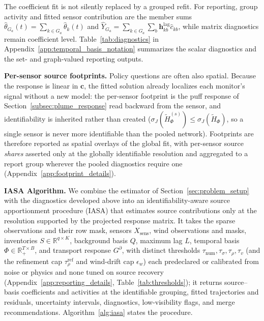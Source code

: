 The coefficient fit is not silently replaced by a grouped refit.  For reporting,
group activity and fitted sensor contribution are the member sums
\(\widehat\theta_{G_a}(t)=\sum_{k\in G_a}\widehat\theta_k(t)\) and
\(\widehat Y_{G_a}=\sum_{k\in G_a}\sum_b
\mathbf h_{kb}^{\mathrm{lag}}\widehat c_{kb}\), while matrix diagnostics remain
coefficient level.  Table~\ref{tab:diagnostics} in
Appendix~\ref{app:temporal_basis_notation} summarizes the scalar diagnostics and
the set- and graph-valued reporting outputs.

\noindent\textbf{Per-sensor source footprints.}
Policy questions are often also spatial.  Because the response is linear in
\(\mathbf c\), the fitted solution already localizes each monitor's signal
without a new model: the per-sensor footprint is the puff response of
Section~\ref{subsec:plume_response} read backward from the sensor, and
identifiability is inherited rather than created
(\(\sigma_J(\widetilde H_\Phi^{(s)})\le\sigma_J(\widetilde H_\Phi)\), so a single
sensor is never more identifiable than the pooled network).  Footprints are
therefore reported as spatial overlays of the global fit, with per-sensor source
\emph{shares} asserted only at the globally identifiable resolution and
aggregated to a report group wherever the pooled diagnostics require one
(Appendix~\ref{app:footprint_details}).

\noindent\textbf{IASA Algorithm.}
We combine the estimator of
Section~\ref{sec:problem_setup} with the diagnostics developed above into an identifiability-aware source
apportionment procedure (IASA) that estimates source contributions only at the
resolution supported by the projected response matrix.  It takes the sparse
observations and their row mask, sensors \(X_{\mathrm{sens}}\), wind observations
and masks, inventories \(S\in\mathbb R^{q\times K}\), background basis \(Q\),
maximum lag \(L\), temporal basis \(\Phi\in\mathbb R_+^{T\times B}\), and transport
response \(G^\partial\), with distinct thresholds
\(\tau_{\mathrm{num}},\tau_\sigma,\tau_\rho,\tau_v\) (and the refinement cap
\(\tau_\rho^{\mathrm{ref}}\) and wind-drift cap \(\epsilon_w\)) each predeclared or
calibrated from noise or physics and none tuned on source recovery
(Appendix~\ref{app:reporting_details}, Table~\ref{tab:thresholds}); it returns
source--basis coefficients and activities at the identifiable grouping, fitted
trajectories and residuals, uncertainty intervals, diagnostics, low-visibility
flags, and merge recommendations.  Algorithm~\ref{alg:iasa} states the procedure.

